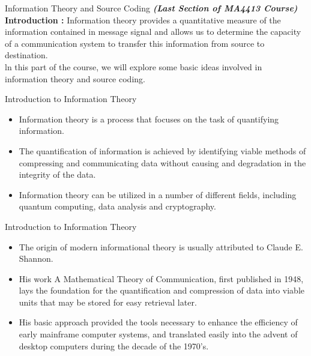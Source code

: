 
{Information Theory and Source Coding}
\textbf{\textit{(Last Section of MA4413 Course)}}\\
\bigskip
\textbf{Introduction : } Information theory provides a quantitative measure of the information contained in message signal and allows us to determine the capacity of a communication system to transfer this information from source to destination. \\ \bigskip ln this part of the course, we will explore some basic ideas involved in information theory and source coding.




{Introduction to Information Theory}
\begin{itemize}
\item Information theory is a process that focuses on the task of quantifying information. 
\item The quantification of information is achieved by identifying viable methods of compressing and communicating data without causing 
and degradation in the integrity of the data. 
\item Information theory can be utilized in a number of different fields, including quantum computing, 
data analysis and cryptography.
\end{itemize}


{Introduction to Information Theory}
\begin{itemize}
\item The origin of modern informational theory is usually attributed to Claude E. Shannon.
\item His work A Mathematical Theory of Communication, first published in 1948, 
lays the foundation for the quantification and compression of data into viable units that may be stored for easy retrieval later. 
\item His basic approach provided the tools necessary to enhance the efficiency of early mainframe computer systems, and translated easily into 
the advent of desktop computers during the decade of the 1970’s.
\end{itemize}


